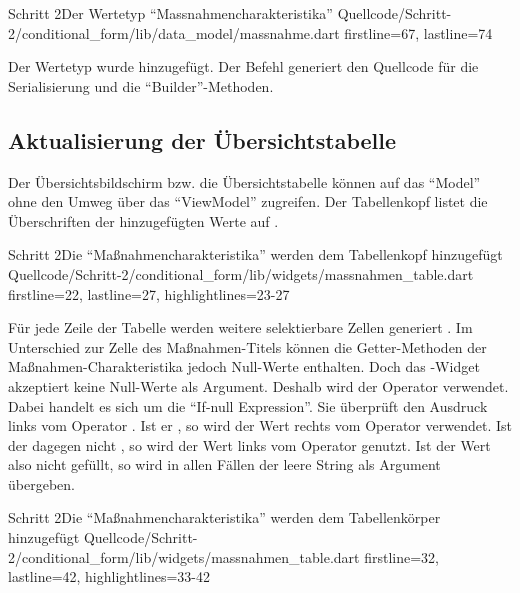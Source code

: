 \begin{alexlisting}{Schritt 2}{Der Wertetyp \enquote{Massnahmencharakteristika}}
  {Quellcode/Schritt-2/conditional_form/lib/data_model/massnahme.dart}
  {firstline=67, lastline=74}
  \label{lst:Schritt2WerteTypMassnahmencharakteristika}
\end{alexlisting}

Der Wertetyp wurde hinzugefügt.
Der Befehl  generiert den Quellcode für die Serialisierung und die \enquote{Builder}-Methoden.

\subsection{Aktualisierung der Übersichtstabelle}

Der Übersichtsbildschirm bzw. die Übersichtstabelle können auf das \enquote{Model} ohne den Umweg über das \enquote{ViewModel} zugreifen. Der Tabellenkopf listet die Überschriften der hinzugefügten Werte auf .

\begin{alexlisting}{Schritt 2}{Die \enquote{Maßnahmencharakteristika} werden dem Tabellenkopf hinzugefügt}
  {Quellcode/Schritt-2/conditional_form/lib/widgets/massnahmen_table.dart}
  {firstline=22, lastline=27, highlightlines={23-27}}
  \label{lst:Schritt2MassnahmencharakteristikaEerdenDemTabellenkopfHinzugefuegt}
\end{alexlisting}

Für jede Zeile der Tabelle werden weitere selektierbare Zellen generiert . Im Unterschied zur Zelle des Maßnahmen-Titels können die Getter-Methoden der Maßnahmen-Charakteristika jedoch Null-Werte enthalten.
Doch das -Widget akzeptiert keine Null-Werte als Argument. Deshalb wird der Operator  verwendet. Dabei handelt es sich um die \enquote{If-null Expression}. 
Sie überprüft den Ausdruck links vom Operator . Ist er , so wird der Wert rechts vom Operator verwendet.
Ist der dagegen nicht , so wird der Wert links vom Operator  genutzt.  Ist der Wert also nicht gefüllt, so wird in allen Fällen der leere String  als Argument übergeben.

\begin{alexlisting}{Schritt 2}{Die \enquote{Maßnahmencharakteristika} werden dem Tabellenkörper hinzugefügt}
  {Quellcode/Schritt-2/conditional_form/lib/widgets/massnahmen_table.dart}
  {firstline=32, lastline=42, highlightlines={33-42}}
  \label{lst:Schritt2MassnahmencharakteristikaWerdenDemTabellenkoerperHinzugefuegt}
\end{alexlisting}

